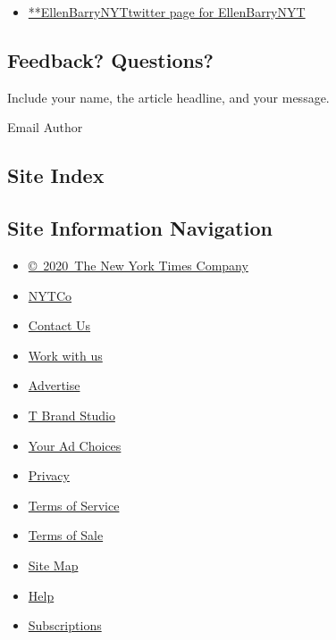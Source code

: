 \begin{itemize}
\tightlist
\item
  \href{https://twitter.com/EllenBarryNYT}{**EllenBarryNYTtwitter page
  for EllenBarryNYT}
\end{itemize}

\hypertarget{feedback-questions}{%
\subsection{Feedback? Questions?}\label{feedback-questions}}

Include your name, the article headline, and your message.

Email Author

\hypertarget{site-index}{%
\subsection{Site Index}\label{site-index}}

\hypertarget{site-information-navigation}{%
\subsection{Site Information
Navigation}\label{site-information-navigation}}

\begin{itemize}
\tightlist
\item
  \href{https://help.nytimes.com/hc/en-us/articles/115014792127-Copyright-notice}{©~2020~The
  New York Times Company}
\end{itemize}

\begin{itemize}
\tightlist
\item
  \href{https://www.nytco.com/}{NYTCo}
\item
  \href{https://help.nytimes.com/hc/en-us/articles/115015385887-Contact-Us}{Contact
  Us}
\item
  \href{https://www.nytco.com/careers/}{Work with us}
\item
  \href{https://nytmediakit.com/}{Advertise}
\item
  \href{http://www.tbrandstudio.com/}{T Brand Studio}
\item
  \href{https://www.nytimes.com/privacy/cookie-policy\#how-do-i-manage-trackers}{Your
  Ad Choices}
\item
  \href{https://www.nytimes.com/privacy}{Privacy}
\item
  \href{https://help.nytimes.com/hc/en-us/articles/115014893428-Terms-of-service}{Terms
  of Service}
\item
  \href{https://help.nytimes.com/hc/en-us/articles/115014893968-Terms-of-sale}{Terms
  of Sale}
\item
  \href{https://spiderbites.nytimes.com}{Site Map}
\item
  \href{https://help.nytimes.com/hc/en-us}{Help}
\item
  \href{https://www.nytimes.com/subscription?campaignId=37WXW}{Subscriptions}
\end{itemize}
